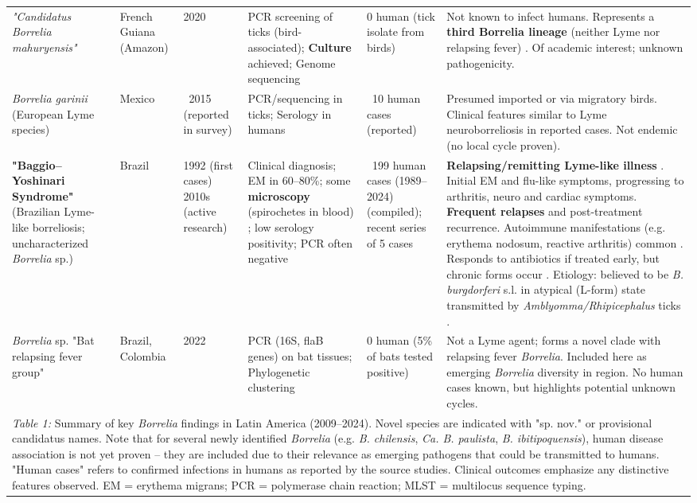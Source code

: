 \documentclass[11pt,letterpaper]{article}
\begin{document}
\begin{table}[H]
{\begin{tabular}{@{}lllllp{4cm}@{}}
\textit{"Candidatus Borrelia mahuryensis"} & French Guiana (Amazon) & 2020 \citep{Binetruy2020i} & PCR screening of ticks (bird-associated); \textbf{Culture} achieved; Genome sequencing & 0 human (tick isolate from birds) & Not known to infect humans. Represents a \textbf{third Borrelia lineage} (neither Lyme nor relapsing fever) \citep{Binetruy2020j, Binetruy2020k}. Of academic interest; unknown pathogenicity. \\
\textit{Borrelia garinii} (European Lyme species) & Mexico & ~2015 (reported in survey) \citep{Colunga-Salas2020n} & PCR/sequencing in ticks; Serology in humans & ~10 human cases (reported) \citep{Colunga-Salas2020o} & Presumed imported or via migratory birds. Clinical features similar to Lyme neuroborreliosis in reported cases. Not endemic (no local cycle proven). \\
\textbf{"Baggio–Yoshinari Syndrome"} (Brazilian Lyme-like borreliosis; uncharacterized \textit{Borrelia} sp.) & Brazil & 1992 (first cases) 2010s (active research) & Clinical diagnosis; EM in 60–80\%; some \textbf{microscopy} (spirochetes in blood) \citep{Lucca2024p}; low serology positivity; PCR often negative & ~199 human cases (1989–2024) \citep{Labruna2024b} (compiled); recent series of 5 cases \citep{Yoshinari2022ab} & \textbf{Relapsing/remitting Lyme-like illness} \citep{Yoshinari2022ac}. Initial EM and flu-like symptoms, progressing to arthritis, neuro and cardiac symptoms. \textbf{Frequent relapses} and post-treatment recurrence. Autoimmune manifestations (e.g. erythema nodosum, reactive arthritis) common \citep{Yoshinari2022ad}. Responds to antibiotics if treated early, but chronic forms occur \citep{Yoshinari2022ae}. Etiology: believed to be \textit{B. burgdorferi} s.l. in atypical (L-form) state transmitted by \textit{Amblyomma/Rhipicephalus} ticks \citep{Yoshinari2022af}. \\
\textit{Borrelia} sp. "Bat relapsing fever group" & Brazil, Colombia & 2022 \citep{Lucca2024ag} & PCR (16S, flaB genes) on bat tissues; Phylogenetic clustering & 0 human (5\% of bats tested positive) \citep{Lucca2024ah} & Not a Lyme agent; forms a novel clade with relapsing fever \textit{Borrelia}. Included here as emerging \textit{Borrelia} diversity in region. No human cases known, but highlights potential unknown cycles. \\ \bottomrule
\multicolumn{6}{p{\textwidth}}{\textit{Table 1:} Summary of key \textit{Borrelia} findings in Latin America (2009–2024). Novel species are indicated with "sp. nov." or provisional candidatus names. Note that for several newly identified \textit{Borrelia} (e.g. \textit{B. chilensis}, \textit{Ca. B. paulista}, \textit{B. ibitipoquensis}), human disease association is not yet proven – they are included due to their relevance as emerging pathogens that could be transmitted to humans. "Human cases" refers to confirmed infections in humans as reported by the source studies. Clinical outcomes emphasize any distinctive features observed. EM = erythema migrans; PCR = polymerase chain reaction; MLST = multilocus sequence typing.} \\
\end{tabular}%
}
\end{table}
\end{document}
